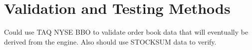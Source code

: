 \section{Validation and Testing Methods}
Could use TAQ NYSE BBO to validate order book data that will eventually be
derived from the engine. Also should use STOCKSUM data to verify.
